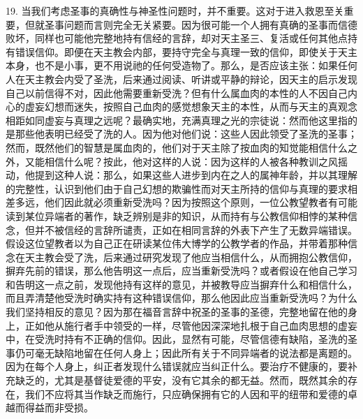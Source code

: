 19. 当我们考虑圣事的真确性与神圣性问题时，并不重要。这对于进入救恩至关重要，但就圣事问题而言则完全无关紧要。因为很可能一个人拥有真确的圣事而信德败坏，同样也可能他完整地持有信经的言辞，却对天主圣三、复活或任何其他点持有错误信仰。即便在天主教会内部，要持守完全与真理一致的信仰，即使关于天主本身，也不是小事，更不用说祂的任何受造物了。那么，是否应该主张：如果任何人在天主教会内受了圣洗，后来通过阅读、听讲或平静的辩论，因天主的启示发现自己以前信得不对，因此他需要重新受洗？但有什么属血肉的本性的人不因自己内心的虚妄幻想而迷失，按照自己血肉的感觉想象天主的本性，从而与天主的真观念相距如同虚妄与真理之远呢？最确实地，充满真理之光的宗徒说：然而他这里指的是那些他表明已经受了洗的人。因为他对他们说：这些人因此领受了圣洗的圣事；然而，既然他们的智慧是属血肉的，他们对于天主除了按血肉的知觉能相信什么之外，又能相信什么呢？按此，他对这样的人说：因为这样的人被各种教训之风摇动，他提到这种人说：那么，如果这些人进步到内在之人的属神年龄，并以其理解的完整性，认识到他们由于自己幻想的欺骗性而对天主所持的信仰与真理的要求相差多远，他们因此就必须重新受洗吗？因为按照这个原则，一位公教望教者有可能读到某位异端者的著作，缺乏辨别是非的知识，从而持有与公教信仰相悖的某种信念，但并不被信经的言辞所谴责，正如在相同言辞的外表下产生了无数异端错误。假设这位望教者以为自己正在研读某位伟大博学的公教学者的作品，并带着那种信念在天主教会受了洗，后来通过研究发现了他应当相信什么，从而拥抱公教信仰，摒弃先前的错误，那么他告明这一点后，应当重新受洗吗？或者假设在他自己学习和告明这一点之前，发现他持有这样的意见，并被教导应当摒弃什么和相信什么，而且弄清楚他受洗时确实持有这种错误信仰，那么他因此应当重新受洗吗？为什么我们坚持相反的意见？因为那在福音言辞中祝圣的圣事的圣德，完整地留在他的身上，正如他从施行者手中领受的一样，尽管他因深深地扎根于自己血肉思想的虚妄中，在受洗时持有不正确的信仰。因此，显然有可能，尽管信德有缺陷，圣洗的圣事仍可毫无缺陷地留在任何人身上；因此所有关于不同异端者的说法都是离题的。因为在每个人身上，纠正者发现什么错误就应当纠正什么。要治疗不健康的，要补充缺乏的，尤其是基督徒爱德的平安，没有它其余的都无益。然而，既然其余的存在，我们不应将其当作缺乏而施行，只应确保拥有它的人因和平的纽带和爱德的卓越而得益而非受损。\par

